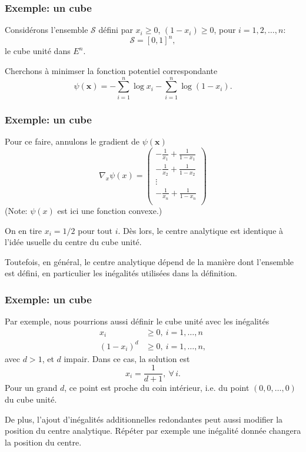 \documentclass[usepdftitle=false, aspectratio=169]{beamer}
\def\bx{\boldsymbol{x}}
\begin{document}
\begin{frame}
\frametitle{Exemple: un cube}

Considérons l'ensemble $\mathcal{S}$ défini par $x_i \geq 0$, $(1-x_i) \geq 0$, pour $i = 1,2,\ldots,n$:
\[
\mathcal{S} = [0,1]^n,
\]
le cube unité dans $E^n$.

\mbox{}

Cherchons à minimser la fonction potentiel correspondante
\[
\psi(\bx) = -\sum_{i = 1}^n \log x_i - \sum_{i = 1}^n \log (1-x_i).
\]

\end{frame}

\begin{frame}
\frametitle{Exemple: un cube}

Pour ce faire, annulons le gradient de $\psi(\bx)$
\[
\nabla_x \psi(x) =
\begin{pmatrix}
- \frac{1}{x_1} + \frac{1}{1-x_1} \\
- \frac{1}{x_2} + \frac{1}{1-x_2} \\
\vdots \\
- \frac{1}{x_n} + \frac{1}{1-x_n} \\
\end{pmatrix}
\]
(Note: $\psi(x)$ est ici une fonction convexe.)

\mbox{}

On en tire $x_i = 1/2$ pour tout $i$.
Dès lors, le centre analytique est identique à l'idée usuelle du centre du cube unité.

\mbox{}

Toutefois, en général, le centre analytique dépend de la manière dont l'ensemble est défini, en particulier les inégalités utilisées dans la définition.

\end{frame}

\begin{frame}
\frametitle{Exemple: un cube}

Par exemple, nous pourrions aussi définir le cube unité avec les inégalités
\begin{align*}
x_i &\geq 0, \ i = 1,\ldots,n\\
(1-x_i)^d &\geq 0,\ i = 1,\ldots,n,
\end{align*}
avec $d > 1$, et $d$ impair.
Dans ce cas, la solution est
\[
x_i = \frac{1}{d+1},\ \forall\, i.
\]
Pour un grand $d$, ce point est proche du coin intérieur, i.e. du point $(0,0,\ldots,0)$ du cube unité.

\mbox{}

De plus, l'ajout d'inégalités additionnelles redondantes peut aussi modifier la position du centre analytique. Répéter par exemple une inégalité donnée changera la position du centre.

\end{frame}
\end{document}
